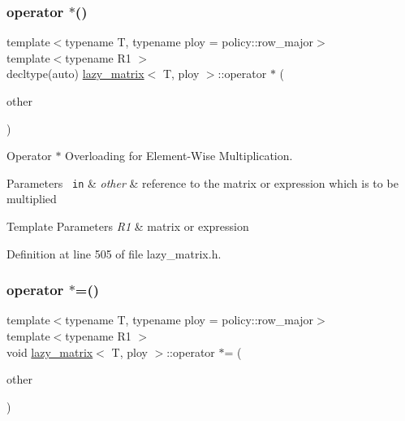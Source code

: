 \subsubsection{\texorpdfstring{operator $\ast$()}{operator *()}}
{\footnotesize\ttfamily template$<$typename T, typename ploy = policy\+::row\+\_\+major$>$ \\
template$<$typename R1 $>$ \\
decltype(auto) \mbox{\hyperlink{classlazy__matrix}{lazy\+\_\+matrix}}$<$ T, ploy $>$\+::operator $\ast$ (\begin{DoxyParamCaption}\item[{const R1 \&}]{other }\end{DoxyParamCaption})\hspace{0.3cm}{\ttfamily [inline]}}



Operator $\ast$ Overloading for Element-\/\+Wise Multiplication. 


\begin{DoxyParams}[1]{Parameters}
\mbox{\texttt{ in}}  & {\em other} & reference to the matrix or expression which is to be multiplied\\
\hline
\end{DoxyParams}

\begin{DoxyTemplParams}{Template Parameters}
{\em R1} & matrix or expression \\
\hline
\end{DoxyTemplParams}


Definition at line 505 of file lazy\+\_\+matrix.\+h.

\mbox{\label{classlazy__matrix_a130ec9cb8a9d894ab3f017533329ae00}} 
\subsubsection{\texorpdfstring{operator $\ast$=()}{operator *=()}}
{\footnotesize\ttfamily template$<$typename T, typename ploy = policy\+::row\+\_\+major$>$ \\
template$<$typename R1 $>$ \\
void \mbox{\hyperlink{classlazy__matrix}{lazy\+\_\+matrix}}$<$ T, ploy $>$\+::operator $\ast$= (\begin{DoxyParamCaption}\item[{const R1 \&}]{other }\end{DoxyParamCaption})\hspace{0.3cm}{\ttfamily [inline]}}




